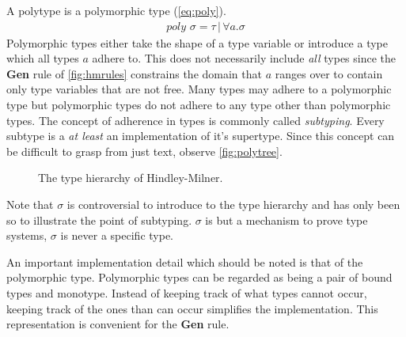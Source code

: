 \documentclass[11pt,oneside,a4paper]{report}
\begin{document}
A polytype is a polymorphic type (\autoref{eq:poly}).
\begin{align}
	poly \,\, \sigma = \tau \,|\, \forall a . \sigma
	\label{eq:poly}
\end{align}
Polymorphic types either take the shape of a type variable or introduce a type which all types $a$ adhere to. 
This does not necessarily include \textit{all} types since the \textbf{Gen} rule of \autoref{fig:hmrules} constrains the domain that $a$ ranges over to contain only type variables that are not free.
Many types may adhere to a polymorphic type but polymorphic types do not adhere to any type other than polymorphic types.
The concept of adherence in types is commonly called \textit{subtyping}.
Every subtype is a \textit{at least} an implementation of it's supertype.
Since this concept can be difficult to grasp from just text, observe \autoref{fig:polytree}.
\begin{figure}[ht]
    \centering
    \caption{The type hierarchy of Hindley-Milner.}
    \label{fig:polytree}
\end{figure}
Note that $\sigma$ is controversial to introduce to the type hierarchy and has only been so to illustrate the point of subtyping.
$\sigma$ is but a mechanism to prove type systems, $\sigma$ is never a specific type.
\begin{remark}
    \label{remark:polyimpl}
An important implementation detail which should be noted is that of the polymorphic type.
Polymorphic types can be regarded as being a pair of bound types and monotype.
Instead of keeping track of what types cannot occur, keeping track of the ones than can occur simplifies the implementation.
This representation is convenient for the \textbf{Gen} rule.
\end{remark}
\end{document}
